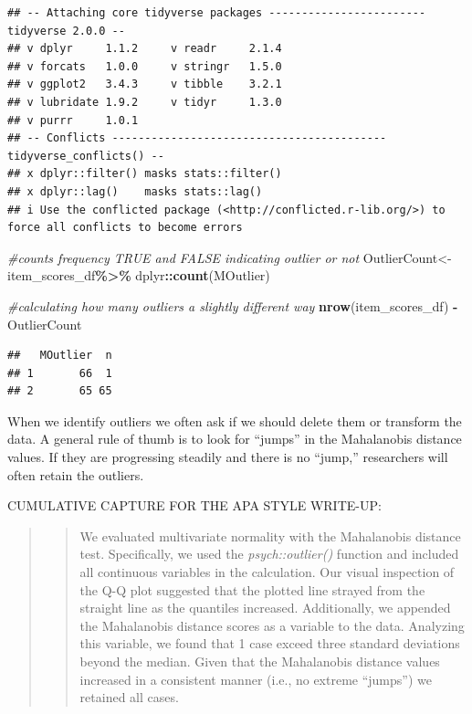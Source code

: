 \documentclass[
  11pt,
]{book}
\newenvironment{Shaded}{\begin{snugshade}}{\end{snugshade}}
\newcommand{\CommentTok}[1]{\textcolor[rgb]{0.37,0.37,0.37}{\textit{#1}}}
\newcommand{\FunctionTok}[1]{\textcolor[rgb]{0.27,0.27,0.27}{\textbf{#1}}}
\newcommand{\NormalTok}[1]{#1}
\newcommand{\OtherTok}[1]{\textcolor[rgb]{0.37,0.37,0.37}{#1}}
\newcommand{\SpecialCharTok}[1]{\textcolor[rgb]{0.43,0.43,0.43}{\textbf{#1}}}
\begin{document}
\begin{verbatim}
## -- Attaching core tidyverse packages ------------------------ tidyverse 2.0.0 --
## v dplyr     1.1.2     v readr     2.1.4
## v forcats   1.0.0     v stringr   1.5.0
## v ggplot2   3.4.3     v tibble    3.2.1
## v lubridate 1.9.2     v tidyr     1.3.0
## v purrr     1.0.1     
## -- Conflicts ------------------------------------------ tidyverse_conflicts() --
## x dplyr::filter() masks stats::filter()
## x dplyr::lag()    masks stats::lag()
## i Use the conflicted package (<http://conflicted.r-lib.org/>) to force all conflicts to become errors
\end{verbatim}

\begin{Shaded}
\begin{Highlighting}[]
\CommentTok{\#counts frequency TRUE and FALSE indicating outlier or not}
\NormalTok{OutlierCount}\OtherTok{\textless{}{-}}\NormalTok{ item\_scores\_df}\SpecialCharTok{\%\textgreater{}\%}
\NormalTok{  dplyr}\SpecialCharTok{::}\FunctionTok{count}\NormalTok{(MOutlier)}

\CommentTok{\#calculating how many outliers a slightly different way}
\FunctionTok{nrow}\NormalTok{(item\_scores\_df) }\SpecialCharTok{{-}}\NormalTok{ OutlierCount }
\end{Highlighting}
\end{Shaded}

\begin{verbatim}
##   MOutlier  n
## 1       66  1
## 2       65 65
\end{verbatim}

When we identify outliers we often ask if we should delete them or transform the data. A general rule of thumb is to look for ``jumps'' in the Mahalanobis distance values. If they are progressing steadily and there is no ``jump,'' researchers will often retain the outliers.

CUMULATIVE CAPTURE FOR THE APA STYLE WRITE-UP:

\begin{quote}
\begin{quote}
We evaluated multivariate normality with the Mahalanobis distance test. Specifically, we used the \emph{psych::outlier()} function and included all continuous variables in the calculation. Our visual inspection of the Q-Q plot suggested that the plotted line strayed from the straight line as the quantiles increased. Additionally, we appended the Mahalanobis distance scores as a variable to the data. Analyzing this variable, we found that 1 case exceed three standard deviations beyond the median. Given that the Mahalanobis distance values increased in a consistent manner (i.e., no extreme ``jumps'') we retained all cases.
\end{quote}
\end{quote}
\end{document}
